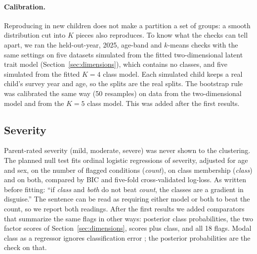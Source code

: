 \paragraph{Calibration.}
Reproducing in new children does not make a partition a set of groups: a smooth distribution cut into $K$ pieces also reproduces. To know what the checks can tell apart, we ran the held-out-year, 2025, age-band and $k$-means checks with the same settings on five datasets simulated from the fitted two-dimensional latent trait model (Section~\ref{sec:dimensions}), which contains no classes, and five simulated from the fitted $K=4$ class model. Each simulated child keeps a real child's survey year and age, so the splits are the real splits. The bootstrap rule was calibrated the same way (50 resamples) on data from the two-dimensional model and from the $K=5$ class model. This was added after the first results.

\subsection{Severity}
\label{sec:severity-method}
Parent-rated severity (mild, moderate, severe) was never shown to the clustering. The planned null test fits ordinal logistic regressions of severity, adjusted for age and sex, on the number of flagged conditions (\emph{count}), on class membership (\emph{class}) and on both, compared by BIC and five-fold cross-validated log-loss. As written before fitting: ``if \emph{class} and \emph{both} do not beat \emph{count}, the classes are a gradient in disguise.'' The sentence can be read as requiring either model or both to beat the count, so we report both readings. After the first results we added comparators that summarize the same flags in other ways: posterior class probabilities, the two factor scores of Section~\ref{sec:dimensions}, scores plus class, and all 18 flags. Modal class as a regressor ignores classification error \citep{vermunt2010}; the posterior probabilities are the check on that.

